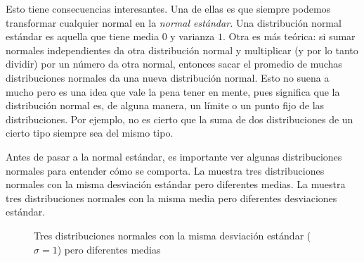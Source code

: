 \informal
Esto tiene consecuencias interesantes. Una de ellas es que siempre podemos transformar cualquier normal en la \emph{normal estándar.} Una distribución normal estándar es aquella que tiene media \(0\) y varianza \(1\). Otra es más teórica: si sumar normales independientes da otra distribución normal y multiplicar (y por lo tanto dividir) por un número da otra normal, entonces sacar el promedio de muchas distribuciones normales da una nueva distribución normal. Esto no suena a mucho pero es una idea que vale la pena tener en mente, pues significa que la distribución normal es, de alguna manera, un límite o un punto fijo de las distribuciones. Por ejemplo, no es cierto que la suma de dos distribuciones de un cierto tipo siempre sea del mismo tipo.

Antes de pasar a la normal estándar, es importante ver algunas distribuciones normales para entender cómo se comporta. La  muestra tres distribuciones normales con la misma desviación estándar pero diferentes medias. La  muestra tres distribuciones normales con la misma media pero diferentes desviaciones estándar.

\begin{figure}
\caption{Tres distribuciones normales con la misma desviación estándar ($\sigma = 1$) pero diferentes medias}
\end{figure}

